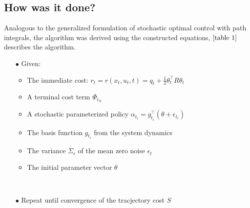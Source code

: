 \documentclass[journal]{IEEEtran}
\begin{document}
\subsection{How was it done?}

Analogous to the generalized formulation of stochastic optimal control with path integrals, the algorithm 
was derived using the constructed equations, 
$\ref{table 1}$ describes the algorithm.

\begin{table}
    \caption{}
    \label{table 1}
     \begin{itemize}
       \item[$\bullet$] Given: 
       \begin{itemize}
         
         \item The immediate cost: $r_t = r(x_t,u_t,t) = q_t + \frac{1}{2} \theta_t^{\top} R \theta_t$
         \ \\
         \item A terminal cost term $\Phi_{t_N}$
         \ \\
         \item A stochastic parameterized policy $\alpha_{t_i} = g_{t_i}^{\top} (\theta + \epsilon_{t_i})$
         \ \\
         \item The basis function $g_{t_i}$ from the system dynamics
         \ \\
         \item The variance $\Sigma_{\epsilon}$ of the mean zero noise $\epsilon_t$
         \ \\
         \item The initial parameter vector $\theta$ 
       \end{itemize}  
        \ \\
       \item[$\bullet$] Repeat until convergence of the tracjectory cost $S$
       \begin{itemize}
         

\end{itemize}
\end{itemize}
\end{table}
\end{document}
